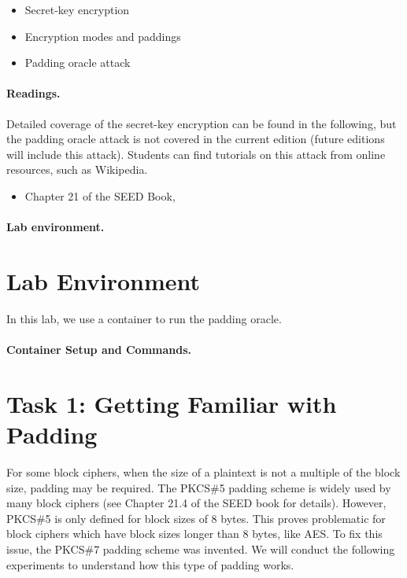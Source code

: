 \begin{itemize}[noitemsep]
\item Secret-key encryption
\item Encryption modes and paddings
\item Padding oracle attack
\end{itemize}


\paragraph{Readings.}
Detailed coverage of the secret-key encryption can be found in the following,
but the padding oracle attack is not covered in the current edition
(future editions will include this attack). Students can find tutorials
on this attack from online resources, such as Wikipedia.

\begin{itemize}
\item Chapter 21 of the SEED Book, \seedbook
\end{itemize}


\paragraph{Lab environment.} \seedenvironmentC


\section{Lab Environment}

In this lab, we use a container to run the padding oracle. 


\paragraph{Container Setup and Commands.}



\section{Task 1: Getting Familiar with Padding}

For some block ciphers, when the size of a plaintext is not a multiple
of the block size, padding may be required.
The PKCS\#5 padding scheme is widely used by many block
ciphers (see Chapter 21.4 of the SEED book for details).
However, PKCS\#5 is only defined for block sizes of 8 bytes.
This proves problematic for block ciphers which have block sizes longer than 8 bytes, like AES.
To fix this issue, the PKCS\#7 padding scheme was invented.
We will conduct the following experiments to
understand how this type of padding works.

